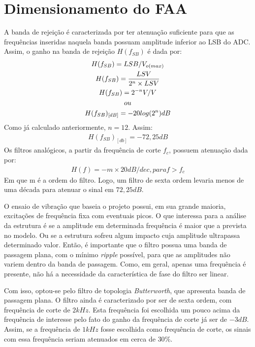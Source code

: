 \documentclass[11pt]{abntex2}
\begin{document}
			\section{Dimensionamento do FAA}

				A banda de rejeição é caracterizada por ter atenuação
				suficiente para que as frequências inseridas naquela banda possuam amplitude
				inferior ao LSB do ADC. Assim, o ganho na banda de rejeição $H(f_{SB})$ é
				dada por:
				\begin{gather*}
					H(f_{SB}) = LSB/V_{o(max)}\\
					H(f_{SB}) = \frac{LSV}{2^n\times LSV}\\
					H(f_{SB}) = 2^{-n}V/V\\
					ou\\
					H(f_{SB})_{[dB]} = -20\*log(2^n) dB
				\end{gather*}
				Como já calculado anteriormente, $n=12$. Assim:
				\begin{gather*}
					H(f_{SB})_{[db]} = -72,25 dB
				\end{gather*}
				Os filtros analógicos, a partir da frequência de corte $f_c$, possuem
				atenuação dada por:
				\begin{gather*}
					H(f) = -m\times 20 dB/dec, para f>f_c
				\end{gather*}
				Em que m é a ordem do filtro. Logo, um filtro de sexta ordem levaria
				menos de uma década para atenuar o sinal em $72,25dB$.

				O ensaio de vibração que baseia o projeto possui, em sua grande
				maioria, excitações de frequência fixa com eventuais picos. O que
				interessa para a análise da estrutura é se a amplitude em
				determinada frequência é maior que a prevista no modelo. Ou se a
				estrutura sofreu algum impacto cuja amplitude ultrapassa determinado
				valor. Então, é importante que o filtro possua uma banda de passagem
				plana, com o mínimo \textit{ripple} possível, para que as amplitudes não
				variem dentro da banda de passagem. Como, em geral, apenas uma
				frequência é presente, não há a necessidade da característica de
				fase do filtro ser linear.

				Com isso, optou-se pelo filtro de topologia
				\textit{Butterworth}, que apresenta banda de passagem plana. O
				filtro ainda é caracterizado por ser de sexta ordem, com
				frequência de corte de $2kHz$. Esta frequência foi escolhida um
				pouco acima da frequência de interesse pelo fato do ganho da
				frequência de corte já ser de $-3dB$. Assim, se a frequência de
				$1kHz$ fosse escolhida como frequência de corte, os sinais com
				essa frequência seriam atenuados em cerca de $30\%$.
\end{document}
